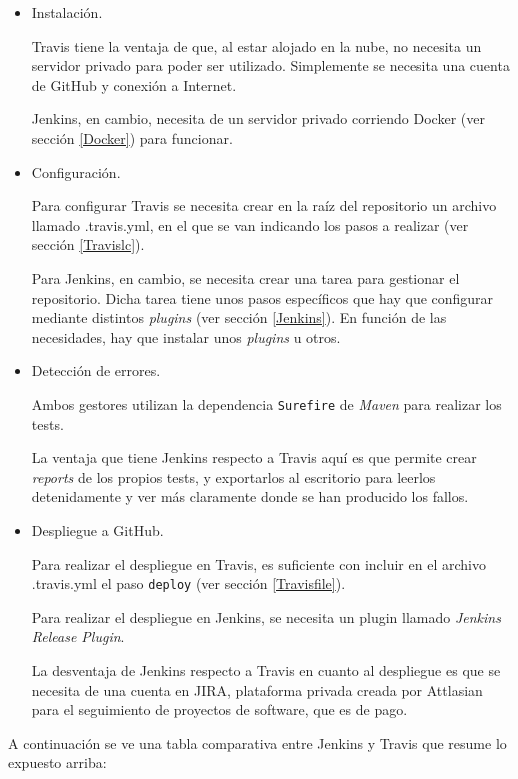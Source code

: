 \begin{itemize}
	\item Instalación.
	
	Travis tiene la ventaja de que, al estar alojado en la nube, no necesita un servidor privado para poder ser utilizado. Simplemente se necesita una cuenta de GitHub y conexión a Internet. 
	
	Jenkins, en cambio, necesita de un servidor privado corriendo Docker (ver sección \ref{Docker}) para funcionar.
	
	\item Configuración.
	
	Para configurar Travis se necesita crear en la raíz del repositorio un archivo llamado .travis.yml, en el que se van indicando los pasos a realizar (ver sección \ref{Travislc}).
	
	Para Jenkins, en cambio, se necesita crear una tarea para gestionar el repositorio. Dicha tarea tiene unos pasos específicos que hay que configurar mediante distintos \textit{plugins} (ver sección \ref{Jenkins}). En función de las necesidades, hay que instalar unos \textit{plugins} u otros.
	\item Detección de errores.
	
	Ambos gestores utilizan la dependencia \texttt{Surefire} de \textit{Maven} para realizar los tests. 
	
	La ventaja que tiene Jenkins respecto a Travis aquí es que permite crear \textit{reports} de los propios tests, y exportarlos al escritorio para leerlos detenidamente y ver más claramente donde se han producido los fallos.
	
	\item Despliegue a GitHub.
	
	Para realizar el despliegue en Travis, es suficiente con incluir en el archivo .travis.yml el paso \texttt{deploy} (ver sección \ref{Travisfile}).
	
	Para realizar el despliegue en Jenkins, se necesita un plugin llamado \textit{Jenkins Release Plugin}.
	
	La desventaja de Jenkins respecto a Travis en cuanto al despliegue es que se necesita de una cuenta en JIRA, plataforma privada creada por Attlasian para el seguimiento de proyectos de software, que es de pago.
	
	
\end{itemize}

A continuación se ve una tabla comparativa entre Jenkins y Travis que resume lo expuesto arriba:

